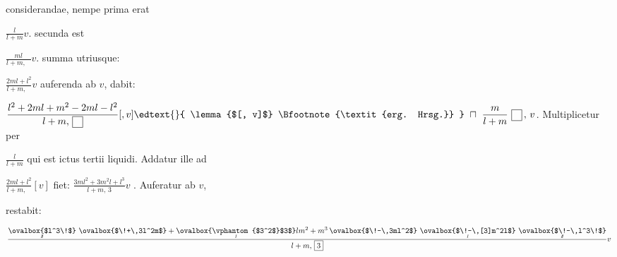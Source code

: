 considerandae, nempe prima erat \rule[-4mm]{0mm}{10mm}$\displaystyle \frac{l}{l + m} v$.
secunda est 
%
%
\rule[-4mm]{0mm}{10mm}$\displaystyle \frac{ml}{l + m, \, \boxed{\phantom{\scriptstyle{2}}}} v$.
summa utriusque: 
\rule[-4mm]{0mm}{10mm}$\displaystyle \frac{2ml + l^2}{l + m, \, \boxed{\phantom{\scriptstyle{2}}}} v$ 
auferenda ab $\displaystyle v$, dabit:
\rule[-4mm]{0mm}{10mm}$\displaystyle \frac{l^2 + 2ml + m^2 - 2ml - l^2}{l + m, \, \boxed{\phantom{\scriptstyle{2}}}}[, v]
\edtext{}{
	\lemma{$[, v]$}
	\Bfootnote{\textit{erg. Hrsg.}}
} 
\ \sqcap \ \frac{m}{l + m} \ \boxed{\phantom{\scriptstyle{2}}} \,, \, v$.
Multiplicetur per \rule[-4mm]{0mm}{10mm}$\displaystyle \frac{l}{l + m}$
%
%
qui est ictus tertii liquidi. Addatur ille ad
\rule[-4mm]{0mm}{10mm}$\displaystyle \frac{2ml + l^2}{l + m, \, \boxed{\phantom{\scriptstyle{2}}}}[v]$
fiet: $\displaystyle \frac{3ml^2 + 3m^2 l + l^3}{l + m, \, \boxed{3}} v$
. Auferatur ab $\displaystyle v$,\rule[-4mm]{0mm}{10mm} restabit: 
\rule[-4mm]{0mm}{10mm}$\displaystyle 
\frac{
	\underset{\scriptscriptstyle{I\!\!I}}{\smash[b]{\ovalbox{$l^3\!$}}} \ \ovalbox{$\!+\,3l^2m$} + 
	\underset{\scriptscriptstyle{I}}{\smash[b]{\ovalbox{\vphantom{$3^2$}$3$}}} 
	lm^2 + m^3 \, \ovalbox{$\!-\,3ml^2$} \ 
	\underset{\scriptscriptstyle{I}}{\smash[b]{\ovalbox{$\!-\,[3]m^2l$}}} \ 
	\underset{\scriptscriptstyle{I\!\!I}}{\smash[b]{\ovalbox{$\!-\,l^3\!$}}}
}{
	l + m, \, \boxed{3}}
v$
\edtext{,}{
	\lemma{}
	\Bfootnote{$-\,2m^2l$ \textit{\ L \"{a}ndert Hrsg.\ }}
}
